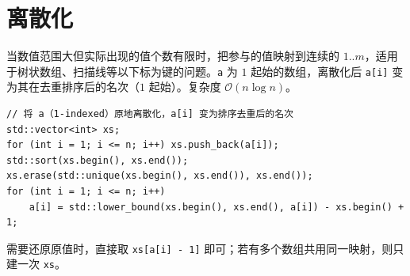 \section{离散化}

当数值范围大但实际出现的值个数有限时，把参与的值映射到连续的 $1..m$，适用于树状数组、扫描线等以下标为键的问题。\texttt{a} 为 $1$ 起始的数组，离散化后 \texttt{a[i]} 变为其在去重排序后的名次（$1$ 起始）。复杂度 $\mathcal{O}(n\log n)$。

\begin{lstlisting}
// 将 a（1-indexed）原地离散化，a[i] 变为排序去重后的名次
std::vector<int> xs;
for (int i = 1; i <= n; i++) xs.push_back(a[i]);
std::sort(xs.begin(), xs.end());
xs.erase(std::unique(xs.begin(), xs.end()), xs.end());
for (int i = 1; i <= n; i++)
    a[i] = std::lower_bound(xs.begin(), xs.end(), a[i]) - xs.begin() + 1;
\end{lstlisting}

需要还原原值时，直接取 \texttt{xs[a[i] - 1]} 即可；若有多个数组共用同一映射，则只建一次 \texttt{xs}。
